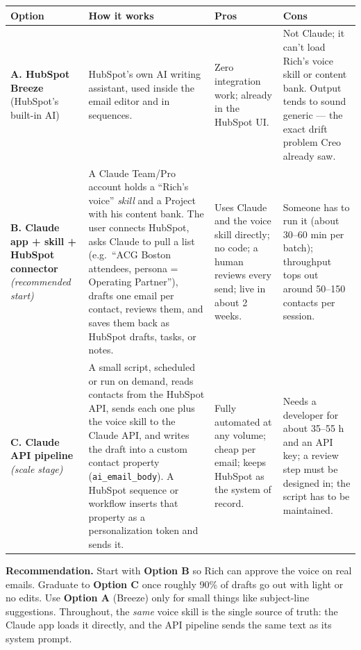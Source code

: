 \documentclass[11pt]{article}
\begin{document}
\begin{center}
\renewcommand{\arraystretch}{1.3}\small
\begin{tabular}{L{2.6cm} L{4.3cm} L{3.6cm} L{3.6cm}}
\toprule
\textbf{Option} & \textbf{How it works} & \textbf{Pros} & \textbf{Cons} \\
\midrule
\textbf{A. HubSpot Breeze} (HubSpot's built-in AI) &
HubSpot's own AI writing assistant, used inside the email editor and in sequences. &
Zero integration work; already in the HubSpot UI. &
Not Claude; it can't load Rich's voice skill or content bank. Output tends to sound generic
--- the exact drift problem Creo already saw. \\
\addlinespace
\textbf{B. Claude app + skill + HubSpot connector} \emph{(recommended start)} &
A Claude Team/Pro account holds a ``Rich's voice'' \emph{skill} and a Project with his content
bank. The user connects HubSpot, asks Claude to pull a list (e.g.\ ``ACG Boston attendees,
persona = Operating Partner''), drafts one email per contact, reviews them, and saves them back
as HubSpot drafts, tasks, or notes. &
Uses Claude and the voice skill directly; no code; a human reviews every send; live in about
2 weeks. &
Someone has to run it (about 30--60 min per batch); throughput tops out around 50--150 contacts
per session. \\
\addlinespace
\textbf{C. Claude API pipeline} \emph{(scale stage)} &
A small script, scheduled or run on demand, reads contacts from the HubSpot API, sends each one
plus the voice skill to the Claude API, and writes the draft into a custom contact property
(\texttt{ai\_email\_body}). A HubSpot sequence or workflow inserts that property as a
personalization token and sends it. &
Fully automated at any volume; cheap per email; keeps HubSpot as the system of record. &
Needs a developer for about 35--55 h and an API key; a review step must be designed in; the
script has to be maintained. \\
\bottomrule
\end{tabular}
\end{center}

\begin{callout}
\textbf{Recommendation.} Start with \textbf{Option B} so Rich can approve the voice on real
emails. Graduate to \textbf{Option C} once roughly 90\% of drafts go out with light or no
edits. Use \textbf{Option A} (Breeze) only for small things like subject-line suggestions.
Throughout, the \emph{same} voice skill is the single source of truth: the Claude app loads it
directly, and the API pipeline sends the same text as its system prompt.
\end{callout}
\end{document}
